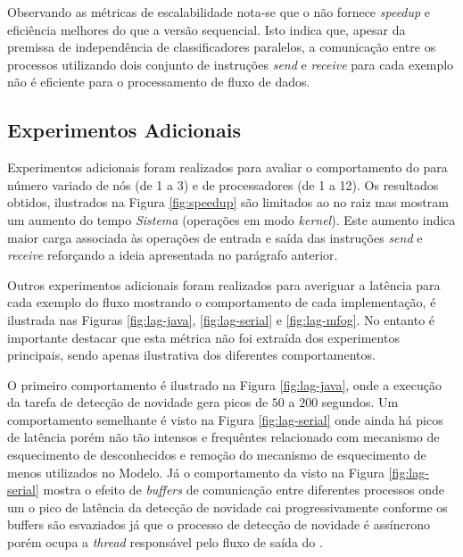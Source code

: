Observando as métricas de escalabilidade nota-se que o \mfog não fornece
\emph{speedup} e eficiência melhores do que a versão sequencial.
Isto indica que, apesar da premissa de independência de classificadores
paralelos, a comunicação entre os processos utilizando dois conjunto de
instruções \mpi \emph{send} e \emph{receive} para cada exemplo não é eficiente
para o processamento de fluxo de dados.

\subsection{Experimentos Adicionais}

Experimentos adicionais foram realizados para avaliar o comportamento do \mfog
para número variado de nós (de 1 a 3) e de processadores (de 1 a 12).
Os resultados obtidos, ilustrados na Figura \ref{fig:speedup} são limitados ao
no raiz mas mostram um aumento do tempo \emph{Sistema} (operações em modo
\emph{kernel}).
Este aumento indica maior carga associada às operações de entrada e saída das
instruções \emph{send} e \emph{receive} reforçando a ideia apresentada no
parágrafo anterior.

Outros experimentos adicionais foram realizados para averiguar a latência para
cada exemplo do fluxo mostrando o comportamento de cada implementação, é
ilustrada nas Figuras \ref{fig:lag-java}, \ref{fig:lag-serial} e
\ref{fig:lag-mfog}.
No entanto é importante destacar que esta métrica não foi extraída dos
experimentos principais, sendo apenas ilustrativa dos diferentes comportamentos.

O primeiro comportamento é ilustrado na Figura \ref{fig:lag-java}, onde a execução
da tarefa de detecção de novidade gera picos de $50$ a $200$ segundos.
Um comportamento semelhante é visto na Figura \ref{fig:lag-serial} onde ainda há
picos de latência porém não tão intensos e frequêntes relacionado com mecanismo
de esquecimento de desconhecidos e remoção do mecanismo de esquecimento de
\mclusters menos utilizados no Modelo.
Já o comportamento da visto na Figura \ref{fig:lag-serial} mostra o efeito de
\emph{buffers} de comunicação entre diferentes processos onde um o pico de latência
da detecção de novidade cai progressivamente conforme os buffers são esvaziados
já que o processo de detecção de novidade é assíncrono porém ocupa a \emph{thread}
responsável pelo fluxo de saída do \mfog.

